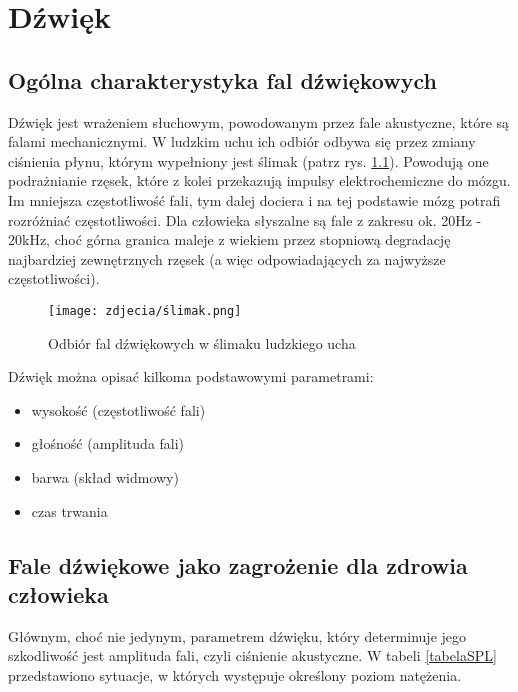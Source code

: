 \chapter{Dźwięk}
\label{cha:dwiek}

\section{Ogólna charakterystyka fal dźwiękowych}
Dźwięk jest wrażeniem słuchowym, powodowanym przez fale akustyczne, które są falami mechanicznymi. W ludzkim uchu ich odbiór odbywa się przez zmiany ciśnienia płynu, którym wypełniony jest ślimak (patrz rys. \ref{ślimak}). Powodują one podrażnianie rzęsek, które z kolei przekazują impulsy elektrochemiczne do mózgu. Im mniejsza częstotliwość fali, tym dalej dociera i na tej podstawie mózg potrafi rozróżniać częstotliwości. Dla człowieka słyszalne są fale z zakresu ok. 20Hz - 20kHz, choć górna granica maleje z wiekiem przez stopniową degradację najbardziej zewnętrznych rzęsek (a więc odpowiadających za najwyższe częstotliwości).\cite{JakSlyszymy} 

\begin{figure}[h]
	\centering
	\texttt{[image: zdjecia/ślimak.png]}
	\caption{\label{ślimak} Odbiór fal dźwiękowych w ślimaku ludzkiego ucha}
\end{figure}

Dźwięk można opisać kilkoma podstawowymi parametrami:
\begin{itemize}
	\item wysokość (częstotliwość fali)
	\item głośność (amplituda fali)
	\item barwa (skład widmowy)
	\item czas trwania
\end{itemize}

\section{Fale dźwiękowe jako zagrożenie dla zdrowia człowieka}
Głównym, choć nie jedynym, parametrem dźwięku, który determinuje jego szkodliwość jest amplituda fali, czyli ciśnienie akustyczne. W tabeli \ref{tabelaSPL} przedstawiono sytuacje, w których występuje określony poziom natężenia.

